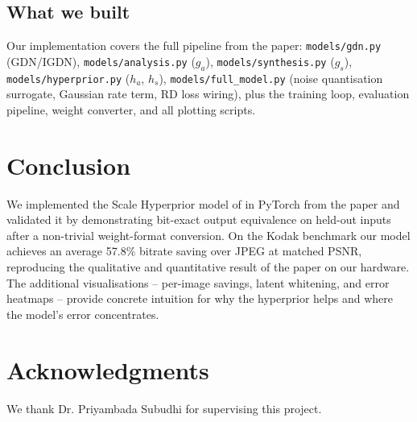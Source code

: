 \documentclass[review]{elsarticle}
\begin{document}
\subsection{What we built}
Our implementation covers the full pipeline from the paper: \texttt{models/gdn.py} (GDN/IGDN), \texttt{models/analysis.py} ($g_a$), \texttt{models/synthesis.py} ($g_s$), \texttt{models/hyperprior.py} ($h_a$, $h_s$), \texttt{models/full\_model.py} (noise quantisation surrogate, Gaussian rate term, RD loss wiring), plus the training loop, evaluation pipeline, weight converter, and all plotting scripts.

\section{Conclusion}
\label{sec:conclusion}

We implemented the Scale Hyperprior model of \cite{balle2018} in PyTorch from the paper and validated it by demonstrating bit-exact output equivalence on held-out inputs after a non-trivial weight-format conversion. On the Kodak benchmark our model achieves an average 57.8\% bitrate saving over JPEG at matched PSNR, reproducing the qualitative and quantitative result of the paper on our hardware. The additional visualisations -- per-image savings, latent whitening, and error heatmaps -- provide concrete intuition for why the hyperprior helps and where the model's error concentrates.

\section*{Acknowledgments}
We thank Dr. Priyambada Subudhi for supervising this project.
\end{document}

